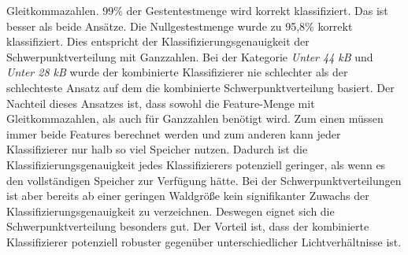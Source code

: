 Gleitkommazahlen. 99\% der Gestentestmenge wird korrekt klassifiziert. Das ist besser als beide Ansätze. Die Nullgestestmenge wurde zu 95,8\% korrekt klassifiziert. Dies entspricht der Klassifizierungsgenauigkeit der
Schwerpunktverteilung mit Ganzzahlen. Bei der Kategorie \textit{Unter 44 kB} und \textit{Unter 28 kB} wurde der kombinierte Klassifizierer nie schlechter als der schlechteste Ansatz auf dem die kombinierte
Schwerpunktverteilung basiert.
\newline
\newline
Der Nachteil dieses Ansatzes ist, dass sowohl die Feature-Menge mit Gleitkommazahlen, als auch für Ganzzahlen benötigt wird. Zum einen müssen immer beide Features berechnet werden und zum anderen kann jeder Klassifizierer
nur halb so viel Speicher nutzen. Dadurch ist die Klassifizierungsgenauigkeit jedes Klassifizierers potenziell geringer, als wenn es den vollständigen Speicher zur Verfügung hätte. Bei der Schwerpunktverteilungen ist aber
bereits ab einer geringen Waldgröße kein signifikanter Zuwachs der Klassifizierungsgenauigkeit zu verzeichnen. Deswegen eignet sich die Schwerpunktverteilung besonders gut. Der Vorteil ist, dass der kombinierte
Klassifizierer potenziell robuster gegenüber unterschiedlicher Lichtverhältnisse ist.

